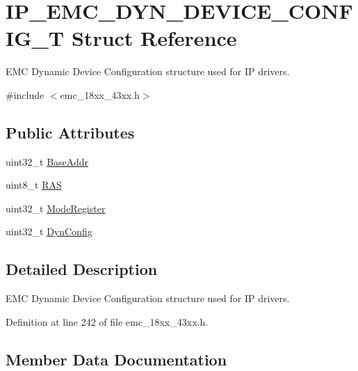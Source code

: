 \hypertarget{struct_i_p___e_m_c___d_y_n___d_e_v_i_c_e___c_o_n_f_i_g___t}{}\section{I\+P\+\_\+\+E\+M\+C\+\_\+\+D\+Y\+N\+\_\+\+D\+E\+V\+I\+C\+E\+\_\+\+C\+O\+N\+F\+I\+G\+\_\+T Struct Reference}
\label{struct_i_p___e_m_c___d_y_n___d_e_v_i_c_e___c_o_n_f_i_g___t}


E\+MC Dynamic Device Configuration structure used for IP drivers.  




{\ttfamily \#include $<$emc\+\_\+18xx\+\_\+43xx.\+h$>$}

\subsection*{Public Attributes}
\begin{DoxyCompactItemize}
\item 
uint32\+\_\+t \hyperlink{struct_i_p___e_m_c___d_y_n___d_e_v_i_c_e___c_o_n_f_i_g___t_a83aab3f24e1589693c98d873e676e6f4}{Base\+Addr}
\item 
uint8\+\_\+t \hyperlink{struct_i_p___e_m_c___d_y_n___d_e_v_i_c_e___c_o_n_f_i_g___t_ae712583a182845c0eb500202fa49a025}{R\+AS}
\item 
uint32\+\_\+t \hyperlink{struct_i_p___e_m_c___d_y_n___d_e_v_i_c_e___c_o_n_f_i_g___t_a96909d62b2a9bb1778a91e2b3dea866c}{Mode\+Register}
\item 
uint32\+\_\+t \hyperlink{struct_i_p___e_m_c___d_y_n___d_e_v_i_c_e___c_o_n_f_i_g___t_ae76bc4efe23e4171f65ec5e948bcbc34}{Dyn\+Config}
\end{DoxyCompactItemize}


\subsection{Detailed Description}
E\+MC Dynamic Device Configuration structure used for IP drivers. 

Definition at line 242 of file emc\+\_\+18xx\+\_\+43xx.\+h.



\subsection{Member Data Documentation}
\mbox{\label{struct_i_p___e_m_c___d_y_n___d_e_v_i_c_e___c_o_n_f_i_g___t_a83aab3f24e1589693c98d873e676e6f4}} 
